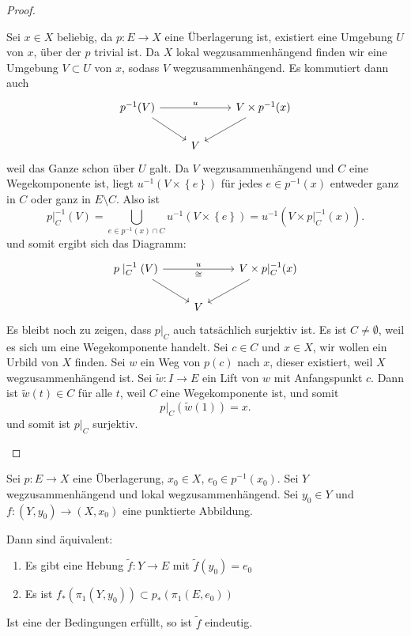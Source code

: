 \begin{proof}
\begin{enumerate}[1)]
            Sei $x\in X$ beliebig, da $p\colon  E \to  X$ eine Überlagerung ist, existiert eine Umgebung $U$ von  $x$, über der  $p$ trivial ist. Da $X$ lokal wegzusammenhängend finden wir  eine Umgebung $V\subset U$ von $x$, sodass  $V$ wegzusammenhängend. Es kommutiert dann auch
            \[
            \begin{tikzcd}
                p^{-1} (V) \ar{rr}{u} \ar[swap]{dr}{} & & V\times p^{-1} (x) \ar{dl}{} \\
            & V
            \end{tikzcd}
            \]
            weil das Ganze schon über $U$ galt. Da  $V$ wegzusammenhängend und  $C$ eine Wegekomponente ist, liegt  $u^{-1}(V\times \left \{e\right\} )$ für jedes $e\in p^{-1} (x)$ entweder ganz in $C$ oder ganz in  $E\setminus C$. Also ist
            \[
                p|_{C}^{-1}(V) = \bigcup_{e\in p^{-1} (x)\cap C} u^{-1}(V\times \left \{e\right\} ) = u^{-1}(V\times p|_{C}^{-1}(x)) 
            .\] 
            und somit ergibt sich das Diagramm:
            \[
            \begin{tikzcd}
                p\mid _C^{-1}(V) \ar{rr}{u}[swap]{\cong} \ar[swap]{dr}{} & & V\times p|_{C}^{-1}(x) \ar{dl}{} \\
            & V
            \end{tikzcd}
            \]
            Es bleibt noch zu zeigen, dass $p|_C$ auch tatsächlich surjektiv ist. Es ist  $C\neq \emptyset$, weil es sich um eine Wegekomponente handelt. Sei $c\in C$ und $x\in X$, wir wollen ein Urbild von $X$ finden. Sei  $w$ ein Weg von $p(c)$ nach  $x$, dieser existiert, weil  $X$ wegzusammenhängend ist. Sei  $\tilde{w}\colon  I \to E$ ein Lift von $w$ mit Anfangspunkt $c$. Dann ist  $\tilde{w}(t) \in C$ für alle $t$, weil  $C$ eine Wegekomponente ist, und somit
             \[
                 p|_C(\tilde{w}(1)) = x
            .\] 
            und somit ist $p|_C$ surjektiv.
    \end{enumerate}
\end{proof}

\begin{theorem}\label{thm:allgemeiner-liftungssatz}
    Sei $p\colon  E \to X$ eine Überlagerung, $x_0\in X$, $e_0\in p^{-1} (x_0)$. Sei $Y$ wegzusammenhängend und lokal wegzusammenhängend. Sei  $y_0\in Y$ und $f\colon  (Y,y_0) \to  (X,x_0)$ eine punktierte Abbildung.

    Dann sind äquivalent:
    \begin{enumerate}[1)]
        \item Es gibt eine Hebung $\tilde{f}\colon  Y \to  E$ mit $\tilde{f}(y_0) = e_0$
        \item Es ist $f_*(\pi_1(Y,y_0)) \subset p_*(\pi_1(E,e_0))$
    \end{enumerate}
    Ist eine der Bedingungen erfüllt, so ist $\tilde{f}$ eindeutig.
\end{theorem}

